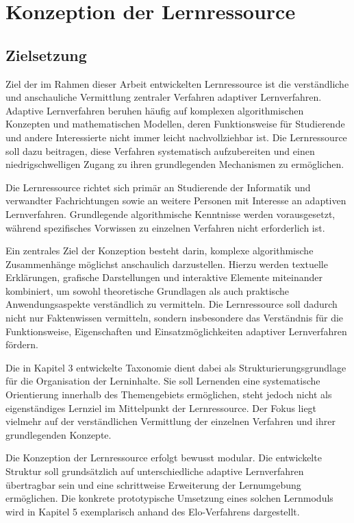 
\chapter{Konzeption der
Lernressource}\label{konzeption-der-lernressource}

\section{Zielsetzung}\label{zielsetzung}

Ziel der im Rahmen dieser Arbeit entwickelten Lernressource ist die
verständliche und anschauliche Vermittlung zentraler Verfahren adaptiver
Lernverfahren. Adaptive Lernverfahren beruhen häufig auf komplexen
algorithmischen Konzepten und mathematischen Modellen, deren
Funktionsweise für Studierende und andere Interessierte nicht immer
leicht nachvollziehbar ist. Die Lernressource soll dazu beitragen, diese
Verfahren systematisch aufzubereiten und einen niedrigschwelligen Zugang
zu ihren grundlegenden Mechanismen zu ermöglichen.

Die Lernressource richtet sich primär an Studierende der Informatik und
verwandter Fachrichtungen sowie an weitere Personen mit Interesse an
adaptiven Lernverfahren. Grundlegende algorithmische Kenntnisse werden
vorausgesetzt, während spezifisches Vorwissen zu einzelnen Verfahren
nicht erforderlich ist.

Ein zentrales Ziel der Konzeption besteht darin, komplexe algorithmische
Zusammenhänge möglichst anschaulich darzustellen. Hierzu werden
textuelle Erklärungen, grafische Darstellungen und interaktive Elemente
miteinander kombiniert, um sowohl theoretische Grundlagen als auch
praktische Anwendungsaspekte verständlich zu vermitteln. Die
Lernressource soll dadurch nicht nur Faktenwissen vermitteln, sondern
insbesondere das Verständnis für die Funktionsweise, Eigenschaften und
Einsatzmöglichkeiten adaptiver Lernverfahren fördern.

Die in Kapitel 3 entwickelte Taxonomie dient dabei als
Strukturierungsgrundlage für die Organisation der Lerninhalte. Sie soll
Lernenden eine systematische Orientierung innerhalb des Themengebiets
ermöglichen, steht jedoch nicht als eigenständiges Lernziel im
Mittelpunkt der Lernressource. Der Fokus liegt vielmehr auf der
verständlichen Vermittlung der einzelnen Verfahren und ihrer
grundlegenden Konzepte.

Die Konzeption der Lernressource erfolgt bewusst modular. Die
entwickelte Struktur soll grundsätzlich auf unterschiedliche adaptive
Lernverfahren übertragbar sein und eine schrittweise Erweiterung der
Lernumgebung ermöglichen. Die konkrete prototypische Umsetzung eines
solchen Lernmoduls wird in Kapitel 5 exemplarisch anhand des
Elo-Verfahrens dargestellt.

